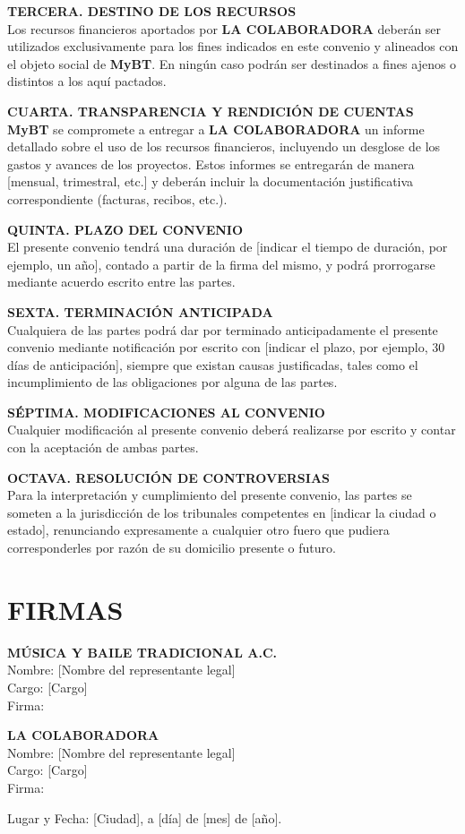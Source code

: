 \documentclass[a4paper,12pt]{article}
\begin{document}
\textbf{TERCERA. DESTINO DE LOS RECURSOS}\\
Los recursos financieros aportados por \textbf{LA COLABORADORA} deberán ser utilizados exclusivamente para los fines indicados en este convenio y alineados con el objeto social de \textbf{MyBT}. En ningún caso podrán ser destinados a fines ajenos o distintos a los aquí pactados.

\textbf{CUARTA. TRANSPARENCIA Y RENDICIÓN DE CUENTAS}\\
\textbf{MyBT} se compromete a entregar a \textbf{LA COLABORADORA} un informe detallado sobre el uso de los recursos financieros, incluyendo un desglose de los gastos y avances de los proyectos. Estos informes se entregarán de manera [mensual, trimestral, etc.] y deberán incluir la documentación justificativa correspondiente (facturas, recibos, etc.).

\textbf{QUINTA. PLAZO DEL CONVENIO}\\
El presente convenio tendrá una duración de [indicar el tiempo de duración, por ejemplo, un año], contado a partir de la firma del mismo, y podrá prorrogarse mediante acuerdo escrito entre las partes.

\textbf{SEXTA. TERMINACIÓN ANTICIPADA}\\
Cualquiera de las partes podrá dar por terminado anticipadamente el presente convenio mediante notificación por escrito con [indicar el plazo, por ejemplo, 30 días de anticipación], siempre que existan causas justificadas, tales como el incumplimiento de las obligaciones por alguna de las partes.

\textbf{SÉPTIMA. MODIFICACIONES AL CONVENIO}\\
Cualquier modificación al presente convenio deberá realizarse por escrito y contar con la aceptación de ambas partes.

\textbf{OCTAVA. RESOLUCIÓN DE CONTROVERSIAS}\\
Para la interpretación y cumplimiento del presente convenio, las partes se someten a la jurisdicción de los tribunales competentes en [indicar la ciudad o estado], renunciando expresamente a cualquier otro fuero que pudiera corresponderles por razón de su domicilio presente o futuro.

\section*{FIRMAS}

\noindent
\textbf{MÚSICA Y BAILE TRADICIONAL A.C.} \\
Nombre: [Nombre del representante legal] \\
Cargo: [Cargo] \\
Firma: \underline{\hspace{7cm}}

\vspace{1cm}

\noindent
\textbf{LA COLABORADORA} \\
Nombre: [Nombre del representante legal] \\
Cargo: [Cargo] \\
Firma: \underline{\hspace{7cm}}

\vspace{1cm}

\noindent
Lugar y Fecha: [Ciudad], a [día] de [mes] de [año].
\end{document}
